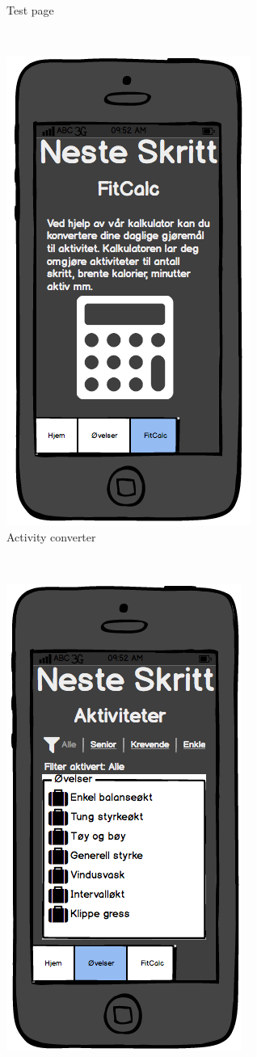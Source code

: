 \begin{figure}[H]
\begin{subfigure}{.5\textwidth}
  \caption{Test page}
  \label{fig:appTest}
\end{subfigure}\\
\begin{subfigure}{.5\textwidth}
  \centering
  \includegraphics[width=.5\linewidth]{wireframes/app/Calc}
  \caption{Activity converter}
  \label{fig:appCalc}
\end{subfigure}\\
\begin{subfigure}{.5\textwidth}
  \centering
  \includegraphics[width=.5\linewidth]{wireframes/app/Activities}

\end{subfigure}
\end{figure}
